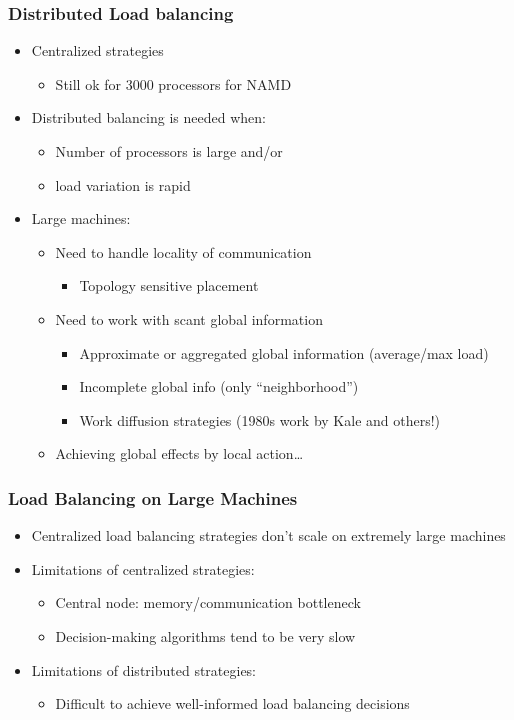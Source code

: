 \begin{frame}[fragile]
\frametitle{Distributed Load balancing}
\begin{itemize}
 \item Centralized strategies
 \begin{itemize}
  \item Still ok for 3000 processors for NAMD
 \end{itemize}
 \item Distributed balancing is needed when:
 \begin{itemize}
  \item Number of processors is large and/or 
  \item load variation is rapid
 \end{itemize}
 \item Large machines: 
 \begin{itemize}
  \item Need to handle locality of communication
  \begin{itemize}
   \item Topology sensitive placement
  \end{itemize}
  \item Need to work with scant global information
  \begin{itemize}
   \item Approximate or aggregated global information (average/max load)
   \item Incomplete global info (only “neighborhood”)
   \item Work diffusion strategies (1980s work by Kale and others!)
  \end{itemize}
  \item Achieving global effects by local action…
 \end{itemize}
\end{itemize}
\end{frame}

\begin{frame}[fragile]
\frametitle{Load Balancing on Large Machines}
\begin{itemize}
 \item Centralized load balancing strategies don’t scale on extremely large machines
 \item Limitations of centralized strategies:
 \begin{itemize}
  \item Central node: memory/communication bottleneck
  \item Decision-making algorithms tend to be very slow
 \end{itemize}
 \item Limitations of distributed strategies:
 \begin{itemize}
  \item Difficult to achieve well-informed load balancing decisions
 \end{itemize}
\end{itemize}
\end{frame}


